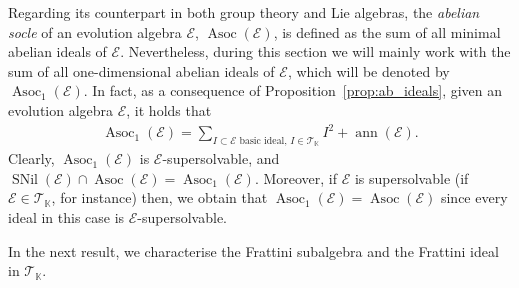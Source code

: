 \documentclass[12pt,reqno]{amsart}
\theoremstyle{definition}
\theoremstyle{remark}
\DeclareMathOperator{\ann}{ann}
\DeclareMathOperator{\asoc}{Asoc}
\DeclareMathOperator{\snil}{SNil}
\numberwithin{equation}{section}
\begin{document}
Regarding its counterpart in both group theory and Lie algebras, the \textit{abelian socle} of an evolution algebra $\mathcal{E}$, $\asoc(\mathcal{E})$, is defined as the sum of all minimal abelian ideals of $\mathcal{E}$. Nevertheless, during this section we will mainly work with the sum of all one-dimensional abelian ideals of $\mathcal{E}$, which will be denoted by $\asoc_1(\mathcal{E})$. In fact, as a consequence of Proposition~\ref{prop:ab_ideals}, given an evolution algebra $\mathcal{E}$, it holds that
\begin{align}\label{eq:def_asoc1}
	\asoc_1(\mathcal{E})=\sum_{I\subset\mathcal{E}\text{ basic ideal, }I\in\mathcal{T}_\mathbb{K}}I^2+\ann(\mathcal{E}).
\end{align}
Clearly, $\asoc_1(\mathcal{E})$ is $\mathcal{E}$-supersolvable, and $\snil(\mathcal{E})\cap \asoc(\mathcal{E})=\asoc_1(\mathcal{E})$. Moreover, if $\mathcal{E}$ is supersolvable (if $\mathcal{E}\in\mathcal{T}_\mathbb{K}$, for instance) then, we obtain that $\asoc_1(\mathcal{E})=\asoc(\mathcal{E})$ since every ideal in this case is $\mathcal{E}$-supersolvable.


In the next result, we characterise the Frattini subalgebra and the Frattini ideal in $\mathcal{T}_\mathbb{K}$.
\end{document}

